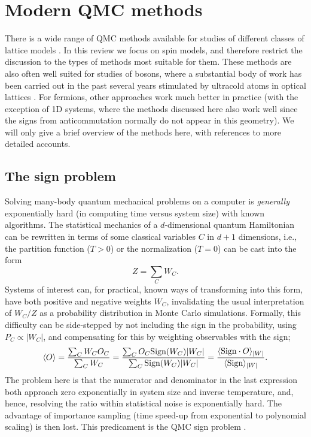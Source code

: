 \documentclass[range]{ar2e}
\begin{document}
\section{Modern QMC methods}
\label{sec:methods}

There is a wide range of QMC methods available for studies of different classes of lattice models \cite{Assaad07,Evertz03,Sandvik10b}. In this review we 
focus on spin models, and therefore restrict the discussion to the types of methods most suitable for them. These methods are also often well suited 
for studies of bosons, where a substantial body of work has been carried out in the past several years stimulated by ultracold atoms in optical 
lattices \cite{Kashurnikov02,Wessel04,Kato08,Pollet10}. For fermions, other approaches \cite{Hirsch82,Assaad07} work much better in practice (with
the exception of 1D systems, where the methods discussed here also work well since the signs from anticommutation normally do not appear in this geometry). 
We will only give a brief overview of the methods here, with references to more detailed accounts.

\subsection{The sign problem}
\label{ss:sign}

Solving many-body quantum mechanical problems on a computer is {\em generally} exponentially hard (in computing time versus system size) 
with known algorithms. The statistical mechanics of a $d$-dimensional quantum Hamiltonian can be rewritten in terms of some classical variables 
$C$ in $d+1$ dimensions, i.e., the partition function ($T>0$) or the normalization ($T=0$) can be cast into the form
\begin{equation}
\label{eq:wc}
Z=\sum_C W_C.
\end{equation}
Systems of interest can, for practical, known ways of transforming into this form, have both positive and negative weights $W_C$, 
invalidating the usual interpretation of $W_C/Z$ as a probability distribution in Monte Carlo simulations. Formally, this difficulty 
can be side-stepped by not including the sign in the probability, using $P_C \propto |W_C|$, and compensating for this by weighting 
observables with the sign;
\begin{equation}
\langle O \rangle = \frac{\sum_C W_C O_C}{\sum_C W_C} =
\frac{\sum_C O_C {\rm Sign}(W_C) |W_C|}{\sum_C {\rm Sign}(W_C)|W_C|} = 
\frac{\langle {\rm Sign} \cdot O\rangle_{|W|}}{\langle {\rm Sign}\rangle_{|W|}}.
\label{expvalue}
\end{equation}
The problem here is that the numerator and denominator in the last expression both approach zero
exponentially in system size and inverse temperature, and, hence, resolving the ratio within 
statistical noise is exponentially hard. The advantage of importance sampling (time speed-up from exponential 
to polynomial scaling) is then lost. This predicament is the QMC sign problem \cite{Loh90,Henelius00,Nyfeler08}.
\end{document}
